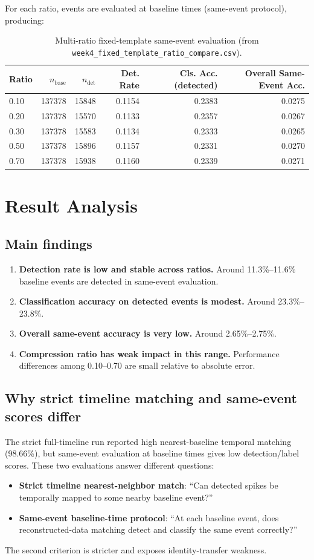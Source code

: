 ﻿\documentclass[11pt]{article}
\begin{document}
For each ratio, events are evaluated at baseline times (same-event protocol), producing:
\begin{table}[h!]
\centering
\begin{tabular}{lrrrrr}
\toprule
Ratio & $n_{\text{base}}$ & $n_{\text{det}}$ & Det. Rate & Cls. Acc. (detected) & Overall Same-Event Acc. \\
\midrule
0.10 & 137378 & 15848 & 0.1154 & 0.2383 & 0.0275 \\
0.20 & 137378 & 15570 & 0.1133 & 0.2357 & 0.0267 \\
0.30 & 137378 & 15583 & 0.1134 & 0.2333 & 0.0265 \\
0.50 & 137378 & 15896 & 0.1157 & 0.2331 & 0.0270 \\
0.70 & 137378 & 15938 & 0.1160 & 0.2339 & 0.0271 \\
\bottomrule
\end{tabular}
\caption{Multi-ratio fixed-template same-event evaluation (from \texttt{week4\_fixed\_template\_ratio\_compare.csv}).}
\end{table}

\section{Result Analysis}
\subsection{Main findings}
\begin{enumerate}
  \item \textbf{Detection rate is low and stable across ratios.} Around 11.3\%--11.6\% baseline events are detected in same-event evaluation.
  \item \textbf{Classification accuracy on detected events is modest.} Around 23.3\%--23.8\%.
  \item \textbf{Overall same-event accuracy is very low.} Around 2.65\%--2.75\%.
  \item \textbf{Compression ratio has weak impact in this range.} Performance differences among 0.10--0.70 are small relative to absolute error.
\end{enumerate}

\subsection{Why strict timeline matching and same-event scores differ}
The strict full-timeline run reported high nearest-baseline temporal matching (98.66\%), but same-event evaluation at baseline times gives low detection/label scores. These two evaluations answer different questions:
\begin{itemize}
  \item \textbf{Strict timeline nearest-neighbor match}: ``Can detected spikes be temporally mapped to some nearby baseline event?''
  \item \textbf{Same-event baseline-time protocol}: ``At each baseline event, does reconstructed-data matching detect and classify the same event correctly?''
\end{itemize}
The second criterion is stricter and exposes identity-transfer weakness.
\end{document}
